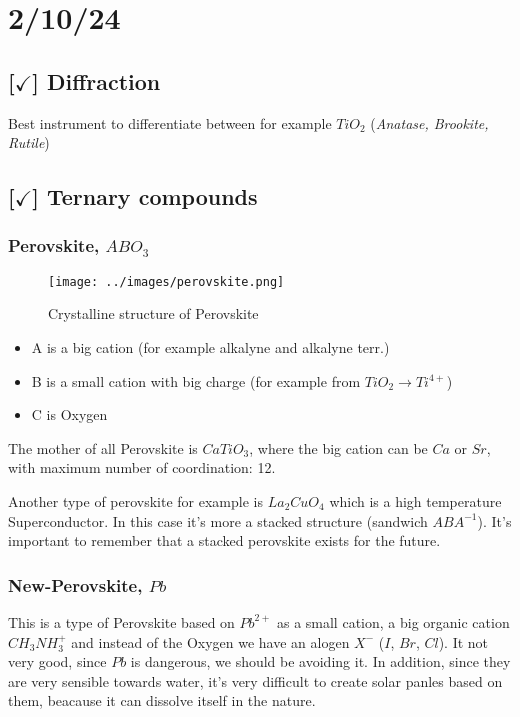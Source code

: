 \section{2/10/24}

\subsection{[$\checkmark$] Diffraction}

Best instrument to differentiate between for example $TiO_2$ (\textit{Anatase, Brookite, Rutile})

\subsection{[$\checkmark$] Ternary compounds}

\subsubsection{Perovskite, $ABO_3$}

\begin{figure}[ht]
    \centering
    \texttt{[image: ../images/perovskite.png]}
    \caption{Crystalline structure of Perovskite}
    \label{fig:perovskite}
\end{figure}

\begin{itemize}
    \item A is a big cation (for example alkalyne and alkalyne terr.)
    \item B is a small cation with big charge (for example from $TiO_2 \rightarrow Ti^{4+}$)
    \item C is Oxygen 
\end{itemize}
%
The mother of all Perovskite is $CaTiO_3$, where the big cation can be $Ca$ or $Sr$, with maximum number of coordination: 12.

Another type of perovskite for example is $La_2CuO_4$ which is a high temperature Superconductor. In this case it's more a stacked structure (sandwich $ABA^{-1}$). It's important to remember that a stacked perovskite exists for the future.

\subsubsection{New-Perovskite, $Pb$}

This is a type of Perovskite based on $Pb^{2+}$ as a small cation, a big organic cation $CH_3NH_3^+$ and instead of the Oxygen we have an alogen $X^-$ ($I$, $Br$, $Cl$). It not very good, since $Pb$ is dangerous, we should be avoiding it. In addition, since they are very sensible towards water, it's very difficult to create solar panles based on them, beacause it can dissolve itself in the nature.

